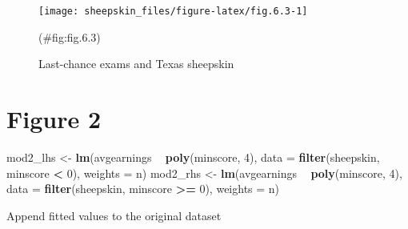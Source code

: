 \documentclass[]{book}
\newenvironment{Shaded}{\begin{snugshade}}{\end{snugshade}}
\newcommand{\DataTypeTok}[1]{\textcolor[rgb]{0.13,0.29,0.53}{#1}}
\newcommand{\DecValTok}[1]{\textcolor[rgb]{0.00,0.00,0.81}{#1}}
\newcommand{\KeywordTok}[1]{\textcolor[rgb]{0.13,0.29,0.53}{\textbf{#1}}}
\newcommand{\NormalTok}[1]{#1}
\newcommand{\OperatorTok}[1]{\textcolor[rgb]{0.81,0.36,0.00}{\textbf{#1}}}
\newcommand{\OtherTok}[1]{\textcolor[rgb]{0.56,0.35,0.01}{#1}}
\newcommand{\StringTok}[1]{\textcolor[rgb]{0.31,0.60,0.02}{#1}}
\theoremstyle{definition}
\theoremstyle{definition}
\theoremstyle{definition}
\theoremstyle{remark}
\begin{document}
\begin{figure}

{\centering \texttt{[image: sheepskin\_files/figure-latex/fig.6.3-1]} 

}

\caption{Last-chance exams and Texas sheepskin}(\#fig:fig.6.3)
\end{figure}

\hypertarget{figure-2}{%
\section{Figure 2}\label{figure-2}}

\begin{Shaded}
\begin{Highlighting}[]
\NormalTok{mod2_lhs <-}\StringTok{ }\KeywordTok{lm}\NormalTok{(avgearnings }\OperatorTok{~}\StringTok{ }\KeywordTok{poly}\NormalTok{(minscore, }\DecValTok{4}\NormalTok{),}
               \DataTypeTok{data =} \KeywordTok{filter}\NormalTok{(sheepskin, minscore }\OperatorTok{<}\StringTok{ }\DecValTok{0}\NormalTok{),}
               \DataTypeTok{weights =}\NormalTok{ n)}
\NormalTok{mod2_rhs <-}\StringTok{ }\KeywordTok{lm}\NormalTok{(avgearnings }\OperatorTok{~}\StringTok{ }\KeywordTok{poly}\NormalTok{(minscore, }\DecValTok{4}\NormalTok{),}
               \DataTypeTok{data =} \KeywordTok{filter}\NormalTok{(sheepskin, minscore }\OperatorTok{>=}\StringTok{ }\DecValTok{0}\NormalTok{), }\DataTypeTok{weights =}\NormalTok{ n)}
\end{Highlighting}
\end{Shaded}

Append fitted values to the original dataset

\begin{Shaded}
\end{Shaded}
\end{document}
